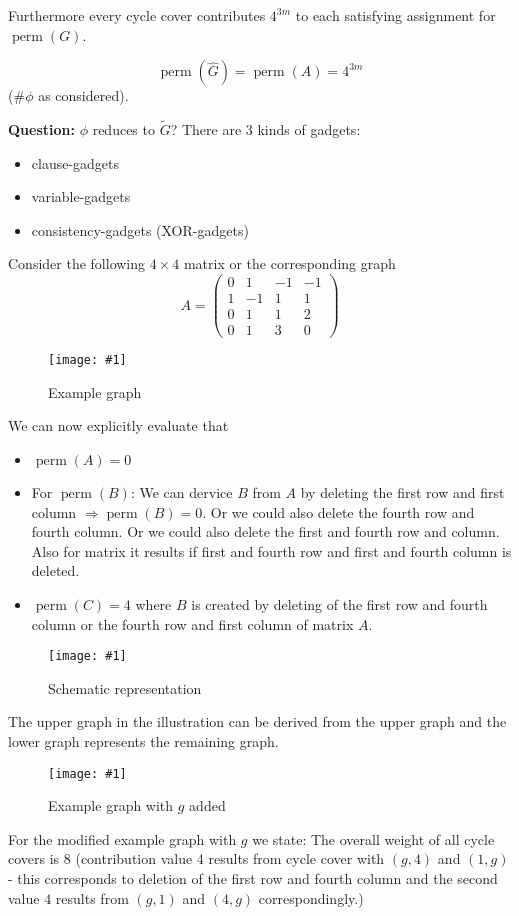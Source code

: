 \documentclass[a4paper]{article}
\newcommand{\pic}[2]{%
 \begin{figure}[ht]
  \begin{center}
   \texttt{[image: \#1]}
   \caption{#2}
  \end{center}
 \end{figure}
}
\begin{document}
Furthermore every cycle cover contributes $4^{3m}$ to each satisfying
assignment for $\operatorname{perm}(G)$.

\[
  \operatorname{perm}(\hat{G}) = \operatorname{perm}(A) = 4^{3m}
\]
($\#\phi$ as considered).

\textbf{Question:} $\phi$ reduces to $\tilde{G}$?
There are 3 kinds of gadgets:
\begin{itemize}
  \item clause-gadgets
  \item variable-gadgets
  \item consistency-gadgets (XOR-gadgets)
\end{itemize}

Consider the following $4\times 4$ matrix or the corresponding graph
\[
  A = \begin{pmatrix}
    0 & 1 & -1 & -1 \\
    1 & -1 & 1 & 1 \\
    0 & 1 & 1 & 2 \\
    0 & 1 & 3 & 0
  \end{pmatrix}
\]

\pic{example_graph.pdf}{Example graph}

We can now explicitly evaluate that
\begin{itemize}
  \item $\operatorname{perm}(A) = 0$
  \item For $\operatorname{perm}(B)$: We can dervice $B$ from $A$
        by deleting the first row and first column $\Rightarrow
        \operatorname{perm}(B) = 0$. Or we could also delete the
        fourth row and fourth column. Or we could also delete the
        first and fourth row and column.
        Also for matrix it results if first and
        fourth row and first and fourth column is deleted.
  \item $\operatorname{perm}(C) = 4$ where $B$ is created by
        deleting of the first row and fourth column or
        the fourth row and first column of matrix $A$.
\end{itemize}

\pic{schematic.pdf}{Schematic representation}

The upper graph in the illustration can be derived from the upper
graph and the lower graph represents the remaining graph.

\pic{example_graph_with_g.pdf}{Example graph with $g$ added}

For the modified example graph with $g$ we state:
The overall weight of all cycle covers is $8$ (contribution
value $4$ results from cycle cover with $(g, 4)$ and $(1, g)$
- this corresponds to deletion of the first row and fourth
column and the second value $4$ results from $(g, 1)$ and
$(4, g)$ correspondingly.)
\end{document}
